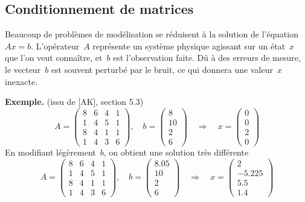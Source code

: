 \subsection{Conditionnement de matrices}

Beaucoup de problèmes de modélisation se réduisent à la solution de
l'équation~$Ax=b$.  L'opérateur~$A$ représente un système physique agissant
sur un état~$x$ que l'on veut connaître, et~$b$ est l'observation faite.
Dû à des erreurs de mesure, le vecteur~$b$ est souvent perturbé par le bruit,
ce qui donnera une valeur~$x$ inexacte.

{\bf Exemple.} (issu de [AK], section 5.3)
\begin{displaymath}
A = \left(\begin{array}{cccc}
8 & 6 & 4 & 1 \\
1 & 4 & 5 & 1 \\
8 & 4 & 1 & 1 \\
1 & 4 & 3 & 6
\end{array}\right), \quad b =  \begin{pmatrix}8 \\ 10 \\ 2 \\ 6\end{pmatrix} \quad
\Rightarrow \quad
x = \begin{pmatrix}0 \\ 0 \\ 2 \\ 0\end{pmatrix}
\end{displaymath}
En modifiant légèrement~$b$, on obtient une solution très différente
\begin{displaymath}
A = \left(\begin{array}{cccc}
8 & 6 & 4 & 1 \\
1 & 4 & 5 & 1 \\
8 & 4 & 1 & 1 \\
1 & 4 & 3 & 6
\end{array}\right), \quad b = \begin{pmatrix}8.05 \\ 10 \\ 2 \\ 6\end{pmatrix} \quad
\Rightarrow \quad x = \begin{pmatrix}2 \\ -5.225 \\ 5.5 \\ 1.4\end{pmatrix}
\end{displaymath}

